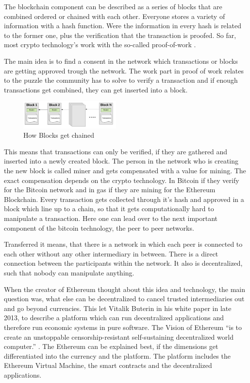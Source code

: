 The blockchain component can be described as a series of blocks that are combined ordered or chained with each other. 
Everyone stores a variety of information with a hash function.
Were the information in every hash is related to the former one, plus the verification that the transaction is proofed. 
So far, most crypto technology’s work with the so-called proof-of-work \cite{Ray2018}.

The main idea is to find a consent in the network which transactions or blocks are getting approved trough the network. The work part in proof of work relates to the puzzle the community has to solve to verify a transaction and if enough transactions get combined, they can get inserted into a block.

\begin{figure}[ht]
\centering
\caption{How Blocks get chained \cite{preethi}}
\includegraphics[width=0.45\textwidth]{blockchain}
\end{figure}

This means that transactions can only be verified, if they are gathered and inserted into a newly created block. The person in the network who is creating the new block is called miner and gets compensated with a value for mining. 
The exact compensation depends on the crypto technology. 
In Bitcoin if they verify for the Bitcoin network and in gas if they are mining for the Ethereum Blockchain. 
Every transaction gets collected through it's hash and approved in a block which line up to a chain, so that it gets computationally hard to manipulate a transaction. 
Here one can lead over to the next important component of the bitcoin technology, the peer to peer networks. 

Transferred it means, that there is a network in which each peer is connected to each other without any other intermediary in between.
There is a direct connection between the participants within the network. 
It also is decentralized, such that nobody can manipulate anything.

When the creator of Ethereum thought about this idea and technology, the main question was, what else can be decentralized to cancel trusted intermediaries out and go beyond currencies.
This let Vitalik Buterin in his white paper in late 2013, to describe a platform which can run decentralized applications and therefore run economic systems in pure software. 
The Vision of Ethereum “is to create an unstoppable censorship-resistant self-sustaining decentralized world computer.” \cite{Ray2018a}.
The Ethereum can be explained best, if the dimensions get differentiated into the currency and the platform. 
The platform includes the Ethereum Virtual Machine, the smart contracts and the decentralized applications. 

